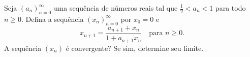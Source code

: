 Seja \((a_n)_{n=0}^\infty\) uma sequência de números reais tal que \(\frac{1}{2} < a_n < 1\) para todo \(n \geq 0\).
Defina a sequência \((x_n)_{n=0}^\infty\) por \(x_0 = 0\) e
\[ x_{n+1} = \frac{a_{n+1} + x_n}{1 + a_{n+1} x_n} \quad \text{para } n \geq 0. \]
A sequência \((x_n)\) é convergente? Se sim, determine seu limite.
